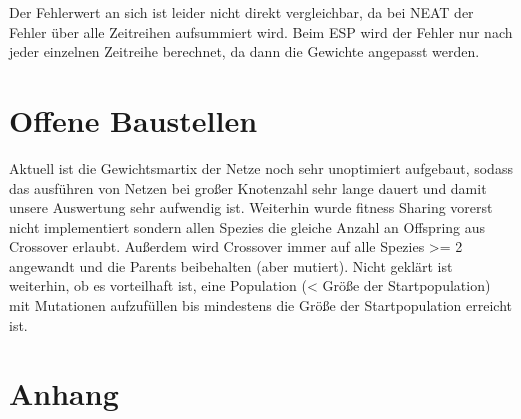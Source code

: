 \documentclass{hbrs-ecta-report}
\begin{document}
Der Fehlerwert an sich ist leider nicht direkt vergleichbar, da bei NEAT der Fehler über alle Zeitreihen aufsummiert wird. Beim ESP wird der Fehler nur nach jeder einzelnen Zeitreihe berechnet, da dann die Gewichte angepasst werden.

\section{Offene Baustellen}
Aktuell ist die Gewichtsmartix der Netze noch sehr unoptimiert aufgebaut, sodass das ausführen von Netzen bei großer Knotenzahl sehr lange dauert und damit unsere Auswertung sehr aufwendig ist.
Weiterhin wurde fitness Sharing vorerst nicht implementiert sondern allen Spezies die gleiche Anzahl an Offspring aus Crossover erlaubt. Außerdem wird Crossover immer auf alle Spezies >= 2 angewandt und die Parents beibehalten (aber mutiert).
Nicht geklärt ist weiterhin, ob es vorteilhaft ist, eine Population (< Größe der Startpopulation) mit Mutationen aufzufüllen bis mindestens die Größe der Startpopulation erreicht ist.


\section{Anhang}
\end{document}
